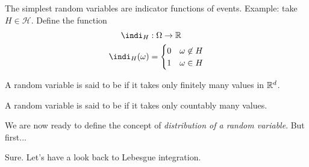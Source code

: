 \documentclass{report}
\begin{document}
\begin{remark}
	The simplest random variables are indicator functions of events.
	Example: take $H\in\mathscr{H}$. Define the function
	\begin{align*}
		\indi_H&:\Omega\rightarrow\R\\
		\indi_H(\omega)&=\begin{cases}
			0 &\omega\not\in H\\
			1 &\omega\in H
		\end{cases}
	\end{align*}
\end{remark}
\begin{remark}
	A random variable is said to be  if it takes only finitely many values in $\mathbb{R}^d$.
\end{remark}
\begin{remark}
	A random variable is said to be  if it takes only countably many values.
\end{remark}
We are now ready to define the concept of \textit{distribution of a random variable}. But first...
\begin{figure}[H]
	\centering
\end{figure}
Sure. Let's have a look back to Lebesgue integration.
\begin{tcolorbox}[enhanced jigsaw,sharp corners, drop fuzzy shadow=gray,colback=white,frame style={white},interior style={fill stretch image=lebe},width=\linewidth,height=0.27\linewidth]
\end{tcolorbox}
\end{document}

